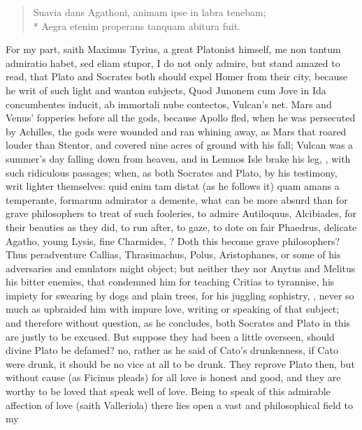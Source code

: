{\begin{latin}
\begin{verse}
Suavia dans Agathoni, animam ipse in labra tenebam;\\*
Aegra etenim properans tanquam abitura fuit.
\end{verse}
\end{latin}

For my part, saith Maximus Tyrius, a great Platonist himself, me
non tantum admiratio habet, sed eliam stupor, I do not only admire, but
stand amazed to read, that Plato and Socrates both should expel Homer
from their city, because he writ of such light and wanton subjects,
Quod Junonem cum Jove in Ida concumbentes inducit, ab immortali nube
contectos, Vulcan's net. Mars and Venus' fopperies before all the gods,
because Apollo fled, when he was persecuted by Achilles, the gods
were wounded and ran whining away, as Mars that roared louder than
Stentor, and covered nine acres of ground with his fall; Vulcan was a
summer's day falling down from heaven, and in Lemnos Isle brake his
leg, \etc{}, with such ridiculous passages; when, as both Socrates and
Plato, by his testimony, writ lighter themselves: quid enim tam distat
(as he follows it) quam amans a temperante, formarum admirator a
demente, what can be more absurd than for grave philosophers to treat
of such fooleries, to admire Autiloquus, Alcibiades, for their beauties
as they did, to run after, to gaze, to dote on fair Phaedrus, delicate
Agatho, young Lysis, fine Charmides, ? Doth
this become grave philosophers? Thus peradventure Callias,
Thrasimachus, Polus, Aristophanes, or some of his adversaries and
emulators might object; but neither they nor Anytus and Melitus
his bitter enemies, that condemned him for teaching Critias to
tyrannise, his impiety for swearing by dogs and plain trees, for his
juggling sophistry, \etc{}, never so much as upbraided him with impure
love, writing or speaking of that subject; and therefore without
question, as he concludes, both Socrates and Plato in this are justly
to be excused. But suppose they had been a little overseen, should
divine Plato be defamed? no, rather as he said of Cato's drunkenness,
if Cato were drunk, it should be no vice at all to be drunk. They
reprove Plato then, but without cause (as Ficinus pleads) for all
love is honest and good, and they are worthy to be loved that speak
well of love. Being to speak of this admirable affection of love (saith
Valleriola) there lies open a vast and philosophical field to my
}
